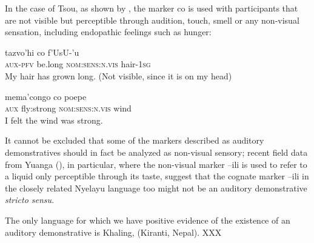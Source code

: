 \documentclass[oneside,a4paper,11pt]{article}
\newcommand{\ipa}[1]{{\phon \mbox{#1}}} %
\begin{document}
In the case of Tsou, as shown by \citet[50-1]{yang00tsou.case}, the marker \ipa{co} is used with participants that are not visible but perceptible through audition, touch, smell or any non-visual sensation, including endopathic feelings such as hunger:


\begin{exe}
\ex 
\gll \ipa{mi-cu} \ipa{tazvo'hi} \ipa{co} \ipa{f'UsU-'u} \\
\textsc{aux-pfv} be.long \textsc{nom:sens:n.vis} hair-\textsc{1sg} \\
\glt My hair has grown long. (Not visible, since it is on my head)
\end{exe}

\begin{exe}
\ex 
\gll \ipa{mo} \ipa{mema'congo} \ipa{co} \ipa{poepe} \\
\textsc{aux} fly:strong \textsc{nom:sens:n.vis} wind \\
\glt I felt the wind was strong.
\end{exe}

It cannot be excluded that some of the markers described as auditory demonstratives should in fact be analyzed as non-visual sensory; recent field data from Yuanga (\citealt{bril-yuanga}), in particular, where the non-visual marker  \ipa{--ili} is used to refer to a liquid only perceptible through its taste, suggest that the cognate marker \ipa{--ili} in the closely related Nyelayu language too might not be an auditory demonstrative \textit{stricto sensu}.

The only language for which we have positive evidence of the existence of an auditory demonstrative is Khaling, (Kiranti, Nepal). XXX

\begin{table}
\caption{Non-propositional evidential systems with non-visual sensory evidentials } \label{tab:attested}
\end{table}	
\end{document}
